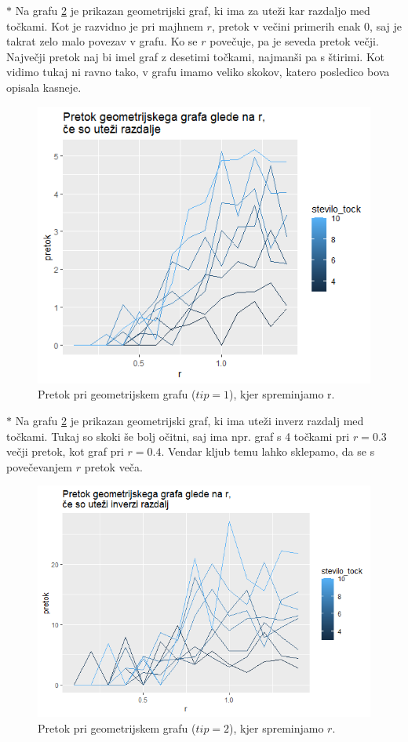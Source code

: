 \documentclass[a4paper]{article}
\begin{document}
$\ast$ Na grafu \ref{fig15} je prikazan geometrijski graf, ki ima za uteži kar razdaljo med točkami. Kot je razvidno je pri majhnem $r$, pretok v večini primerih enak 0, saj je takrat zelo malo povezav v grafu. Ko se $r$ povečuje, pa je seveda pretok večji. Največji pretok naj bi imel graf z desetimi točkami, najmanši pa s štirimi. Kot vidimo tukaj ni ravno tako, v grafu imamo veliko skokov, katero posledico bova opisala kasneje.
\begin{figure}[H]
\centerline{\includegraphics[scale=.5]{p10.PNG}}
\caption{Pretok pri geometrijskem grafu ($tip = 1$), kjer spreminjamo r.}
\label{fig15}
\end{figure} 

$\ast$ Na grafu \ref{fig15} je prikazan geometrijski graf, ki ima uteži inverz razdalj med točkami. Tukaj so skoki še bolj očitni, saj ima npr. graf s 4 točkami pri $r = 0.3$ večji pretok, kot graf pri $r = 0.4.$ Vendar kljub temu lahko sklepamo, da se s povečevanjem $r$ pretok veča. 
\begin{figure}[H]
\centerline{\includegraphics[scale=.5]{p11.PNG}}
\caption{Pretok pri geometrijskem grafu ($tip = 2$), kjer spreminjamo $r$.}
\label{fig15}
\end{figure} 
\end{document}
